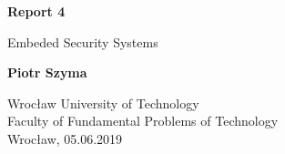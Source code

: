 \begin{titlepage}
  \begin{center}
      \vspace*{1cm}

      \textbf{Report 4}

      \vspace{0.5cm}
       Embeded Security Systems

      \vspace{1.5cm}

      \textbf{Piotr Szyma}

      \vfill

      \vspace{0.8cm}

      Wrocław University of Technology\\
      Faculty of Fundamental Problems of Technology\\
      Wrocław, 05.06.2019

  \end{center}
\end{titlepage}